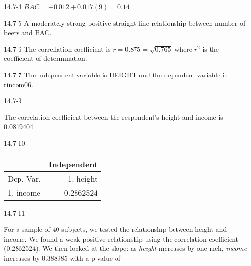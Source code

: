 \begin{exsol@solution}{14.7-4}
     $ BAC = -0.012 + 0.017 (9) = 0.14 $
\end{exsol@solution}
\begin{exsol@solution}{14.7-5}
    A moderately strong positive straight-line relationship between number of beers and BAC.
\end{exsol@solution}
\begin{exsol@solution}{14.7-6}
       The correllation coefficient is $r = 0.875 = \sqrt{0.765}$ where  $r^2$ is the coefficient of determination.
\end{exsol@solution}
\begin{exsol@solution}{14.7-7}
       The independent variable is HEIGHT and the dependent variable is rincom06.
\end{exsol@solution}
\begin{exsol@solution}{14.7-9}

       The correlation coefficient between the respondent's height and income is 0.0819404

\end{exsol@solution}
\begin{exsol@solution}{14.7-10}

       \begin{table}[ht]
    \centering
    \begin{tabular}{lr} \hline
        &  \multicolumn{1}{c}{Independent} \\ \hline

    Dep. Var. & 1. height      \\ \hline
    1. income  &   0.2862524      \\ \hline

    \end{tabular}
    \end{table}


\end{exsol@solution}
\begin{exsol@solution}{14.7-11}

    For a sample of 40 subjects, we tested the relationship between height and income.  We found a weak positive relationship using the correlation coefficient (0.2862524).  We then looked at the slope:  as {\textit{height}} increases by one inch, {\textit{income}} increases by 0.388985 with a p-value of


\end{exsol@solution}
